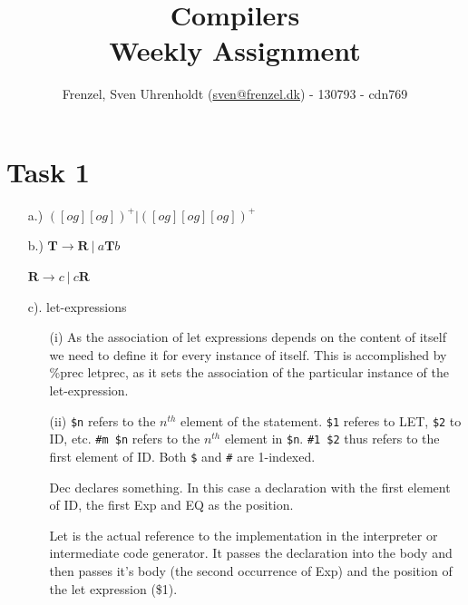 \documentclass[11pt,a4paper]{article}
\author{
  \Large{
    Frenzel, Sven Uhrenholdt (\href{mailto:sven@frenzel.dk}{sven@frenzel.dk}) - 130793 - cdn769}\\
}
\title{
  \huge{Compilers\\}
\vspace{3cm}
\Large{\nth{2} Weekly Assignment}
}
\theoremstyle{plain}
\theoremstyle{definition}
\theoremstyle{remark}
\numberwithin{equation}{section}
\begin{document}


\clearpage\maketitle
\thispagestyle{empty}

\clearpage\newpage
\thispagestyle{plain}


\section{Task 1}
\begin{enumerate}
	\item[a.)] $\left([og][og]\right)^{+}|\left([og][og][og]\right)^{+}$
	\item[b.)]$\textbf{T} \rightarrow \textbf{R}\ |\ a\textbf{T}b$
	
			  $\textbf{R} \rightarrow c\ |\ c\textbf{R}$
	\item[c).] let-expressions
		\begin{enumerate}
			\item[(i)] As the association of let expressions depends on the content of itself we need to define it for every instance of itself. This is accomplished by \%prec letprec, as it sets the association of the particular instance of the let-expression.
			\item[(ii)] \texttt{\$n} refers to the $n^{th}$ element of the statement. \texttt{\$1} referes to LET, \texttt{\$2} to ID, etc. \texttt{\#m \$n} refers to the $n^{th}$ element in \texttt{\$n}. \texttt{\#1 \$2} thus refers to the first element of ID. Both \texttt{\$} and \texttt{\#} are 1-indexed.
			
			Dec declares something. In this case a declaration with the first element of ID, the first Exp and EQ as the position.
			
			Let is the actual reference to the implementation in the interpreter or intermediate code generator. It passes the declaration into the body and then passes it's body (the second occurrence of Exp) and the position of the let expression (\$1).
		\end{enumerate}	
\end{enumerate}
\end{document}
